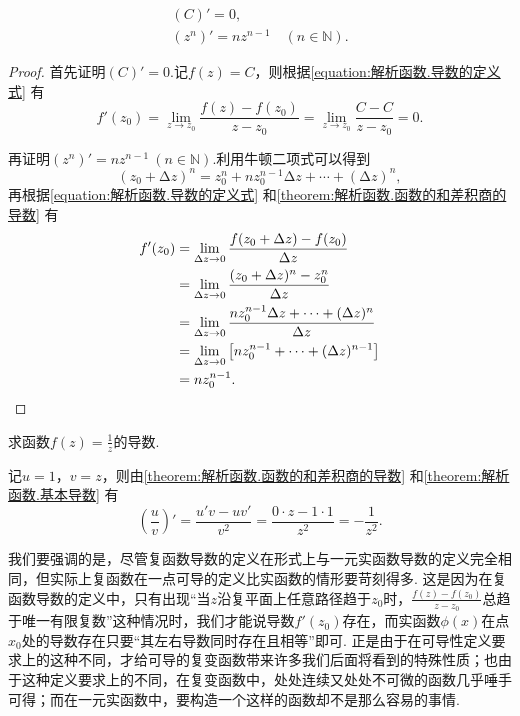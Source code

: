 \begin{theorem}\label{theorem:解析函数.基本导数}
\begin{gather}
(C)' = 0, \\
(z^n)' = n z^{n-1} \quad (n\in\mathbb{N}).
\end{gather}
\begin{proof}
首先证明\((C)' = 0\).记\(f(z) = C\)，则根据\cref{equation:解析函数.导数的定义式} 有\[
f'(z_0) = \lim_{z \to z_0} \frac{f(z)-f(z_0)}{z-z_0}
= \lim_{z \to z_0} \frac{C-C}{z-z_0} = 0.
\]

再证明\((z^n)' = n z^{n-1}\ (n\in\mathbb{N})\).利用牛顿二项式可以得到\[
(z_0 + \increment z)^n = z_0^n + n z_0^{n-1} \increment z + \dotsb + (\increment z)^n,
\]再根据\cref{equation:解析函数.导数的定义式} 和\cref{theorem:解析函数.函数的和差积商的导数} 有\begin{align*}
f'(z_0) &= \lim_{\Delta z\to0} \frac{f(z_0+\Delta z)-f(z_0)}{\Delta z} \\
&= \lim_{\Delta z\to0} \frac{(z_0+\Delta z)^n-z_0^n}{\Delta z} \\
&= \lim_{\Delta z\to0} \frac{n z_0^{n-1} \Delta z + \dotsb + (\Delta z)^n}{\Delta z} \\
&= \lim_{\Delta z\to0} \left[ n z_0^{n-1} + \dotsb + (\Delta z)^{n-1} \right] \\
&= n z_0^{n-1}.
\qedhere
\end{align*}
\end{proof}
\end{theorem}

\begin{example}
求函数\(f(z) = \frac{1}{z}\)的导数.
\begin{solution}
记\(u = 1\)，\(v = z\)，则由\cref{theorem:解析函数.函数的和差积商的导数} 和\cref{theorem:解析函数.基本导数} 有\[
\left(\frac{u}{v}\right)' = \frac{u' v - u v'}{v^2}
= \frac{0 \cdot z - 1 \cdot 1}{z^2}
= - \frac{1}{z^2}.
\]
\end{solution}
\end{example}

我们要强调的是，尽管复函数导数的定义在形式上与一元实函数导数的定义完全相同，但实际上复函数在一点可导的定义比实函数的情形要苛刻得多.
这是因为在复函数导数的定义中，只有出现“当\(z\)沿复平面上任意路径趋于\(z_0\)时，\(\frac{f(z) - f(z_0)}{z - z_0}\)总趋于唯一有限复数”这种情况时，我们才能说导数\(f'(z_0)\)存在，而实函数\(\phi(x)\)在点\(x_0\)处的导数存在只要“其左右导数同时存在且相等”即可.
正是由于在可导性定义要求上的这种不同，才给可导的复变函数带来许多我们后面将看到的特殊性质；也由于这种定义要求上的不同，在复变函数中，处处连续又处处不可微的函数几乎唾手可得；而在一元实函数中，要构造一个这样的函数却不是那么容易的事情.

